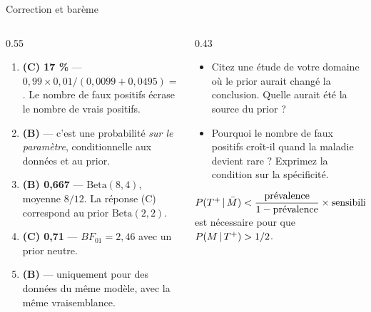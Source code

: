 \begin{frame}{Correction et barème}
\begin{columns}[t]
\begin{column}{0.55\textwidth}
\begin{solbox}[Réponses]
\begin{enumerate}
  \item \textbf{(C) 17 \%} — $0{,}99\times0{,}01 / (0{,}0099+0{,}0495) = 0{,}167$.
        Le nombre de faux positifs écrase le nombre de vrais positifs.
  \item \textbf{(B)} — c'est une probabilité \emph{sur le paramètre}, conditionnelle
        aux données et au prior.
  \item \textbf{(B) 0,667} — $\mathrm{Beta}(8,4)$, moyenne $8/12$.
        La réponse (C) correspond au prior $\mathrm{Beta}(2,2)$.
  \item \textbf{(C) 0,71} — $BF_{01} = 2{,}46$ avec un prior neutre.
  \item \textbf{(B)} — uniquement pour des données du même modèle,
        avec la même vraisemblance.
\end{enumerate}
\end{solbox}
\end{column}
\begin{column}{0.43\textwidth}
\begin{abox}
\begin{itemize}
  \item Citez une étude de votre domaine où le prior aurait changé la conclusion.
        Quelle aurait été la source du prior ?
  \item Pourquoi le nombre de faux positifs croît-il quand la maladie devient rare ?
        Exprimez la condition sur la spécificité.
\end{itemize}
\end{abox}
\begin{kbox}
$P(T^+ \,\vert\, \bar M) < \dfrac{\text{prévalence}}{1-\text{prévalence}} \times \text{sensibilité}$
est nécessaire pour que $P(M \,\vert\, T^+) > 1/2$.
\end{kbox}
\end{column}
\end{columns}
\end{frame}

